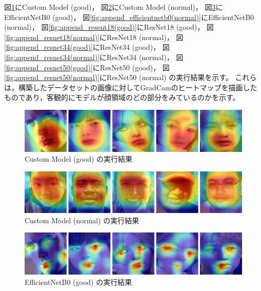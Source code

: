 \documentclass[a4paper,11pt,titlepage]{jsarticle}
\begin{document}
図\ref{fig:append_custom(good)}にCustom Model (good)，
図\ref{fig:append_custom(normal)}にCustom Model (normal)，
図\ref{fig:append_efficientnetb0(good)}にEfficientNetB0 (good)，
図\ref{fig:append_efficientnetb0(normal)}にEfficientNetB0 (normal)，
図\ref{fig:append_resent18(good)}にResNet18 (good)，
図\ref{fig:append_resnet18(normal)}にResNet18 (normal)，
図\ref{fig:append_resnet34(good)}にResNet34 (good)，
図\ref{fig:append_resnet34(normal)}にResNet34 (normal)，
図\ref{fig:append_resnet50(good)}にResNet50 (good)，
図\ref{fig:append_resnet50(normal)}にResNet50 (normal) の実行結果を示す。
これらは，構築したデータセットの画像に対してGradCamのヒートマップを描画したものであり，客観的にモデルが顔領域のどの部分をみているのかを示す。

\begin{figure}[H]
    \centering
    \includegraphics[width=1.1\textwidth]{custom(good).jpg}
    \caption{Custom Model (good) の実行結果}
    \label{fig:append_custom(good)}
\end{figure}

\begin{figure}[H]
    \centering
    \includegraphics[width=1.1\textwidth]{custom(normal).jpg}
    \caption{Custom Model (normal) の実行結果}
    \label{fig:append_custom(normal)}
\end{figure}

\begin{figure}[H]
    \centering
    \includegraphics[width=1.1\textwidth]{efficientnetb0(good).jpg}
    \caption{EfficientNetB0 (good) の実行結果}
    \label{fig:append_efficientnetb0(good)}
\end{figure}
\end{document}
